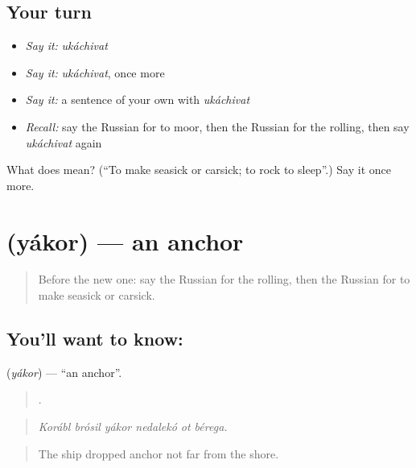 \subsection*{Your turn}
\begin{itemize}
\raggedright
  \item \emph{Say it:} \emph{ukáchivat}
  \item \emph{Say it:} \emph{ukáchivat}, once more
  \item \emph{Say it:} a sentence of your own with \emph{ukáchivat}
  \item \emph{Recall:} say the Russian for to moor, then the Russian for the rolling, then say \emph{ukáchivat} again
\end{itemize}

\begin{tcolorbox}[breakable,colback=teal!4,colframe=teal!35!black,title={Before you move on}]
What does  mean? (\textquotedblleft{}To make seasick or carsick; to rock to sleep\textquotedblright{}.) Say it once more.
\end{tcolorbox}
\section[\texorpdfstring{\ru{якорь} (yákor)}{якорь (yákor)}]{ (yákor) — an anchor}

\label{lesson:RU-C425-yakor}



\begin{quote}
Before the new one: say the Russian for the rolling, then the Russian for to make seasick or carsick.
\end{quote}

\subsection*{You'll want to know: }
\textbf{} (\emph{yákor}) — \textquotedblleft{}an anchor\textquotedblright{}.

\begin{quote}
     .
\end{quote}

\begin{quote}
\emph{Korábl brósil yákor nedalekó ot bérega.}
\end{quote}

\begin{quote}
The ship dropped anchor not far from the shore.
\end{quote}

